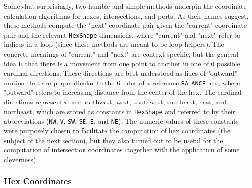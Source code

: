\documentclass[pageno]{jpaper}
\begin{document}
\begin{doublespacing}
Somewhat surprisingly, two humble and simple methods underpin the coordinate calculation algorithms for hexes, intersections, and ports. As their names suggest, these methods compute the "next" coordinate pair given the "current" coordinate pair and the relevant \lstinline$HexShape$ dimensions, where "current" and "next" refer to indices in a loop (since these methods are meant to be loop helpers). The concrete meanings of "current" and "next" are context-specific, but the general idea is that there is a movement from one point to another in one of 6 possible cardinal directions. These directions are best understood as lines of "outward" motion that are perpendicular to the 6 sides of a reference \lstinline$BALANCE$ hex, where "outward" refers to increasing distance from the center of the hex. The cardinal directions represented are northwest, west, southwest, southeast, east, and northeast, which are stored as constants in \lstinline$HexShape$ and referred to by their abbreviations (\lstinline$NW$, \lstinline$W$, \lstinline$SW$, \lstinline$SE$, \lstinline$E$, and \lstinline$NE$). The numeric values of these constants were purposely chosen to facilitate the computation of hex coordinates (the subject of the next section), but they also turned out to be useful for the computation of intersection coordinates (together with the application of some cleverness).

\hypertarget{sec:hex_coordinates}{}
\subsubsection{Hex Coordinates}


\end{doublespacing}
\end{document}

